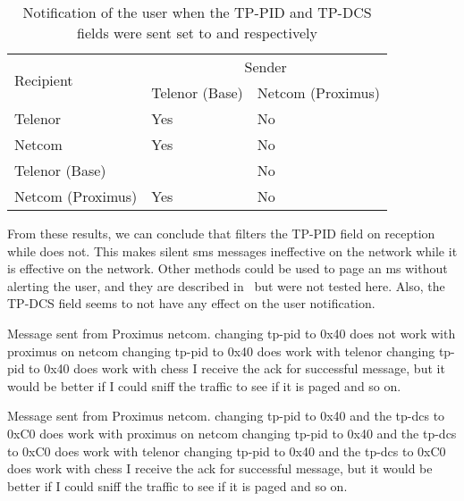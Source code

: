       \begin{table}[h]
        \centering
        \begin{tabular}{@{}lll@{}}
          \toprule
          \multirow{2}{*}{Recipient} & \multicolumn{2}{c}{Sender}   \\
          \cmidrule(l){2-3}
                            & Telenor (Base)    & Netcom (Proximus) \\
          \midrule
          Telenor           & Yes               & No                \\
          Netcom            & Yes               & No                \\
          Telenor (Base)    &                   & No                \\
          Netcom (Proximus) & Yes               & No                \\
          \bottomrule
        \end{tabular}
        \caption{Notification of the user when the TP-PID and TP-DCS
        fields were sent set to  and 
      respectively}
        \label{tab:silent_sms_notification}
      \end{table}
      
      From these results, we can conclude that  filters
      the TP-PID field on reception while  does not. This
      makes silent \gls{sms} messages ineffective on the 
      network while it is effective on the  network. Other
      methods could be used to page an \gls{ms} without alerting the
      user, and they are described in~ but
      were not tested here. Also, the TP-DCS field seems to not have any
      effect on the user notification.

      \iffalse
      Message sent from Proximus netcom.
      changing tp-pid to 0x40 does not work with proximus on netcom
      changing tp-pid to 0x40 does work with telenor
      changing tp-pid to 0x40 does work with chess
      I receive the ack for successful message, but it would be better
      if I could sniff the traffic to see if it is paged and so on.

      Message sent from Proximus netcom.
      changing tp-pid to 0x40 and the tp-dcs to 0xC0 does work with proximus on netcom
      changing tp-pid to 0x40 and the tp-dcs to 0xC0 does work with telenor
      changing tp-pid to 0x40 and the tp-dcs to 0xC0 does work with chess
      I receive the ack for successful message, but it would be better
      if I could sniff the traffic to see if it is paged and so on.

